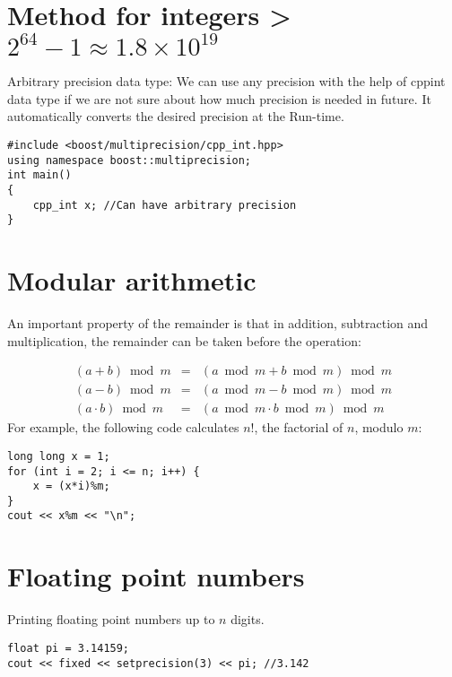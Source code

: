 \documentclass[twoside,12pt,a4paper,english]{book}
\theoremstyle{definition}
\theoremstyle{problemstyle}
\begin{document}
\section{Method for integers > $2^{64} - 1 \approx 1.8\times10^{19}$}

Arbitrary precision data type: We can use any precision with the help of cppint data type if we are not sure about how much precision is needed in future. It automatically converts the desired precision at the Run-time.

\begin{lstlisting}
#include <boost/multiprecision/cpp_int.hpp>
using namespace boost::multiprecision;
int main()
{
    cpp_int x; //Can have arbitrary precision
}
\end{lstlisting}

\section{Modular arithmetic}

An important property of the remainder is that
in addition, subtraction and multiplication,
the remainder can be taken before the operation:

\[
\begin{array}{rcr}
(a+b) \bmod m & = & (a \bmod m + b \bmod m) \bmod m \\
(a-b) \bmod m & = & (a \bmod m - b \bmod m) \bmod m \\
(a \cdot b) \bmod m & = & (a \bmod m \cdot b \bmod m) \bmod m
\end{array}
\]
\linebreak
\linebreak
\linebreak
\linebreak
For example, the following code calculates $n!$,
the factorial of $n$, modulo $m$:
\begin{lstlisting}
long long x = 1;
for (int i = 2; i <= n; i++) {
    x = (x*i)%m;
}
cout << x%m << "\n";
\end{lstlisting}

\section{Floating point numbers}

Printing floating point numbers up to $n$ digits.

\begin{lstlisting}
float pi = 3.14159;
cout << fixed << setprecision(3) << pi; //3.142
\end{lstlisting}
\end{document}
